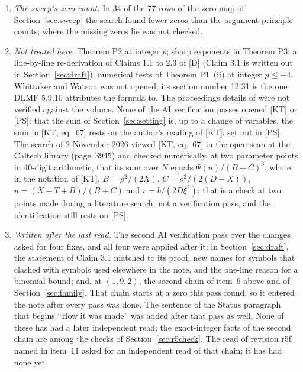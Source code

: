 \documentclass[11pt]{article}
\begin{document}
\begin{enumerate}
\item \emph{The sweep's zero count.} In 34 of the 77 rows of the zero map of Section~\ref{sec:sweep} the search found fewer zeros than the argument principle counts; where the missing zeros lie was not checked.
\item \emph{Not treated here.} Theorem P2 at integer $p$; sharp exponents in Theorem P3; a line-by-line re-derivation of Claims 1.1 to 2.3 of [D] (Claim 3.1 is written out in Section~\ref{sec:draft}); numerical tests of Theorem P1~(ii) at integer $p\le-4$. Whittaker and Watson was not opened; its section number 12.31 is the one DLMF 5.9.10 attributes the formula to. The proceedings details of \cite{UN} were not verified against the volume. None of the AI verification passes opened [KT] or [PS]: that the sum of Section~\ref{sec:setting} is, up to a change of variables, the sum in [KT, eq.~67] rests on the author's reading of [KT], set out in [PS]. The search of 2 November 2026 viewed [KT, eq.~67] in the open scan at the Caltech library (page~3945) and checked numerically, at two parameter points in 40-digit arithmetic, that its sum over $N$ equals $\Psi(u)/(B+C)^3$, where, in the notation of [KT], $B=\rho^2/(2X)$, $C=\rho^2/(2(D-X))$, $u=(X-T+B)/(B+C)$ and $r=b/(2D\xi^2)$; that is a check at two points made during a literature search, not a verification pass, and the identification still rests on [PS].
\item \emph{Written after the last read.} The second AI verification pass over the changes asked for four fixes, and all four were applied after it: in Section~\ref{sec:draft}, the statement of Claim 3.1 matched to its proof, new names for symbols that clashed with symbols used elsewhere in the note, and the one-line reason for a binomial bound; and, at $(1,9,2)$, the second chain of item~6 above and of Section~\ref{sec:family}. That chain starts at a zero this pass found, so it entered the note after every pass was done. The sentence of the Status paragraph that begins ``How it was made'' was added after that pass as well. None of these has had a later independent read; the exact-integer facts of the second chain are among the checks of Section~\ref{sec:r5check}. The read of revision r5f named in item~11 asked for an independent read of that chain; it has had none yet.

\end{enumerate}
\end{document}
